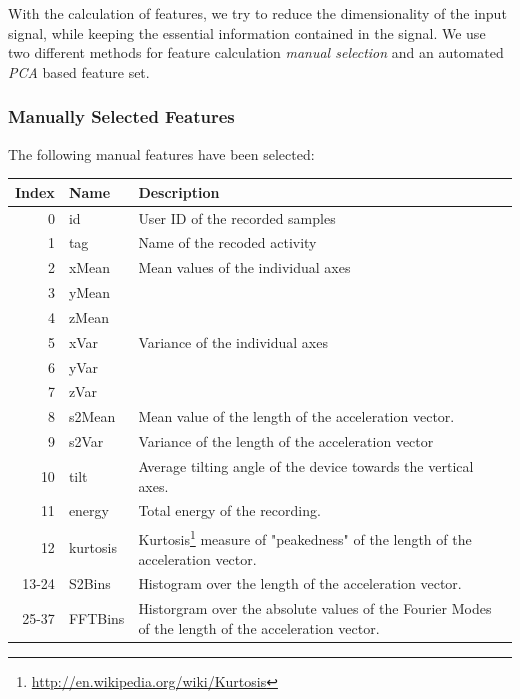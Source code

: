 With the calculation of features, we try to reduce the dimensionality
of the input signal, while keeping the essential information contained
in the signal. We use two different methods for feature calculation
{\it manual selection} and an automated {\it PCA} based feature set.

\subsubsection*{\bf Manually Selected Features}

The following manual features have been selected:

\begin{center}
\begin{tabular}{|r|l|p{11.5cm}|} \hline
Index & Name     & Description \\ \hline
0            & id       & User ID of the recorded samples \\ \hline
1            & tag      & Name of the recoded activity    \\ \hline
2            & xMean    & Mean values of the individual axes \\ 
3            & yMean    &             \\ 
4            & zMean    &             \\ \hline
5            & xVar     & Variance of the individual axes  \\ 
6            & yVar     &             \\ 
7            & zVar     &             \\ \hline
8            & s2Mean   & Mean value of the length of the acceleration
                          vector. \\ \hline
9            & s2Var    & Variance of the length of the acceleration
                          vector \\ \hline
10           & tilt     & Average tilting angle of the device towards
                          the vertical axes. \\ \hline
11           & energy   & Total energy of the recording.  \\ \hline
12           & kurtosis & Kurtosis\footnote{\url{http://en.wikipedia.org/wiki/Kurtosis}} 
                          measure of "peakedness" of the length of 
                          the acceleration vector. \\ \hline
13-24        & S2Bins   & Histogram over the length of the
                          acceleration vector. \\ \hline
25-37        & FFTBins  & Historgram over the absolute values of the
                          Fourier Modes of the length of the
                          acceleration vector. \\ \hline
\end{tabular}
\end{center}

